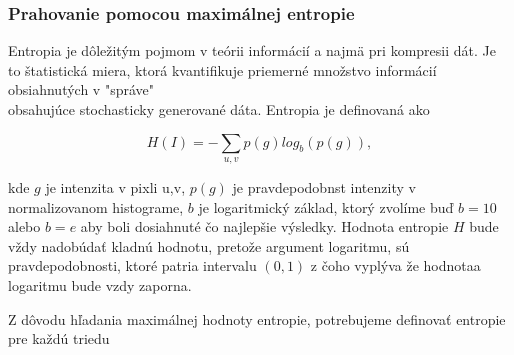 \documentclass[a4paper,11pt,twoside]{article}%
\begin{document}


\subsubsection{Prahovanie pomocou maximálnej entropie}

Entropia je dôležitým pojmom v teórii informácií a najmä pri kompresii dát. Je to štatistická miera, ktorá kvantifikuje priemerné množstvo informácií obsiahnutých v  "správe" \\ obsahujúce stochasticky generované dáta. Entropia je definovaná ako

\begin{equation*}
H(I)= -\sum_{u,v} p(g)log_b(p(g)),
\end{equation*}

kde $g$ je intenzita v pixli u,v, $p(g)$ je pravdepodobnst intenzity v normalizovanom histograme, $b$ je logaritmický základ, ktorý zvolíme buď $b=10$ alebo $b=e$ aby boli dosiahnuté čo najlepšie výsledky. Hodnota entropie $H$ bude vždy nadobúdať kladnú hodnotu, pretože argument logaritmu, sú pravdepodobnosti, ktoré patria intervalu $(0,1)$ z čoho vyplýva že hodnotaa logaritmu bude vzdy zaporna. %

Z dôvodu hľadania maximálnej hodnoty entropie, potrebujeme definovať entropie pre každú triedu
\end{document}
